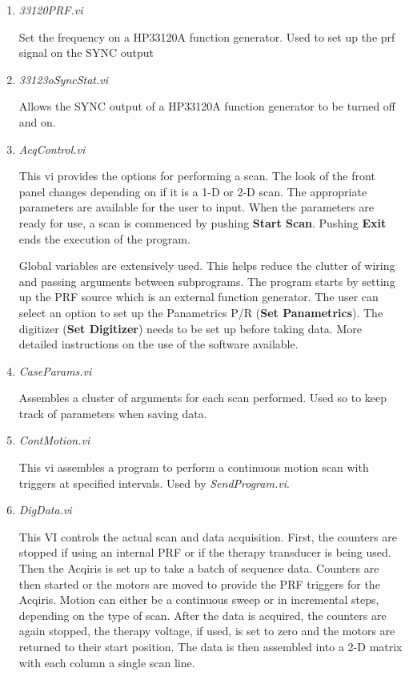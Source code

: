 \documentclass[10pt]{article}
\begin{document}
\begin{enumerate}

\item {\it 33120PRF.vi}

Set the frequency on a HP33120A function generator. Used to set up
the prf signal on the SYNC output

\item {\it 33123oSyncStat.vi}

Allows the SYNC output of a HP33120A function generator to be
turned off and on.

\item {\it AcqControl.vi}

This vi provides the options for performing a scan. The look of
the front panel changes depending on if it is a 1-D or 2-D scan.
The appropriate parameters are available for the user to input.
When the parameters are ready for use, a scan is commenced by
pushing {\bf Start Scan}. Pushing {\bf Exit} ends the execution of
the program.

Global variables are extensively used. This helps reduce the
clutter of wiring and passing arguments between subprograms. The
program starts by setting up the PRF source which is an external
function generator. The user can select an option to set up the
Panametrics P/R ({\bf Set Panametrics}). The digitizer ({\bf Set
Digitizer}) needs to be set up before taking data. More detailed
instructions on the use of the software available.

\item {\it CaseParams.vi}

Assembles a cluster of arguments for each scan performed. Used so
to keep track of parameters when saving data.

\item {\it ContMotion.vi}

This vi assembles a program to perform a continuous motion scan
with triggers at specified intervals. Used by {\it
SendProgram.vi}.

\item {\it DigData.vi}

This VI controls the actual scan and data acquisition. First, the
counters are stopped if using an internal PRF or if the therapy
transducer is being used. Then the Acqiris is set up to take a
batch of sequence data. Counters are then started or the motors
are moved to provide the PRF triggers for the Acqiris. Motion can
either be a continuous sweep or in incremental steps, depending on
the type of scan. After the data is acquired, the counters are
again stopped, the therapy voltage, if used, is set to zero and
the motors are returned to their start position.  The data is then
assembled into a 2-D matrix with each column a single scan line.



\end{enumerate}
\end{document}
